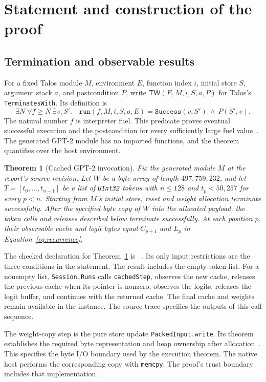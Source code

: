 \documentclass[11pt]{article}
\newcommand{\code}[1]{\texttt{#1}}
\newcommand{\longcode}[1]{\texttt{\seqsplit{#1}}}
\newtheorem{theorem}{Theorem}
\begin{document}
\section{Statement and construction of the proof}

\subsection{Termination and observable results}

For a fixed Talos module $M$, environment $E$, function index $i$, initial store $S$, argument stack $a$, and postcondition $P$, write $\mathsf{TW}(E,M,i,S,a,P)$ for Talos's \code{TerminatesWith}.  Its definition is
\[
\exists N\;\forall f\geq N\;\exists v,S'.\quad
\code{run}(f,M,i,S,a,E)=\code{Success}(v,S')\ \land\ P(S',v).
\]
The natural number $f$ is interpreter fuel.  This predicate proves eventual successful execution and the postcondition for every sufficiently large fuel value~\cite{termination}.  The generated GPT-2 module has no imported functions, and the theorem quantifies over the host environment.

\begin{theorem}[Cached GPT-2 invocation]\label{thm:main}
Fix the generated module $M$ at the report's source revision.  Let $W$ be a byte array of length $497{,}759{,}232$, and let $T=[t_0,\ldots,t_{n-1}]$ be a list of \code{UInt32} tokens with $n\leq128$ and $t_p<50{,}257$ for every $p<n$.  Starting from $M$'s initial store, reset and weight allocation terminate successfully.  After the specified byte copy of $W$ into the allocated payload, the token calls and releases described below terminate successfully.  At each position $p$, their observable cache and logit bytes equal $C_{p+1}$ and $L_p$ in Equation~\eqref{eq:recurrence}.
\end{theorem}

The checked declaration for Theorem~\ref{thm:main} is \longcode{Project.Gpt2CachedStep.Spec.gpt2\_128\_exact}~\cite{session}.  Its only input restrictions are the three conditions in the statement.  The result includes the empty token list.  For a nonempty list, \code{Session.Runs} calls \code{cachedStep}, observes the new cache, releases the previous cache when its pointer is nonzero, observes the logits, releases the logit buffer, and continues with the returned cache.  The final cache and weights remain available in the instance.  The source trace specifies the outputs of this call sequence.

The weight-copy step is the pure store update \code{PackedInput.write}.  Its theorem establishes the required byte representation and heap ownership after allocation~\cite{input}.  This specifies the byte I/O boundary used by the execution theorem.  The native host performs the corresponding copy with \code{memcpy}.  The proof's trust boundary includes that implementation.
\end{document}
